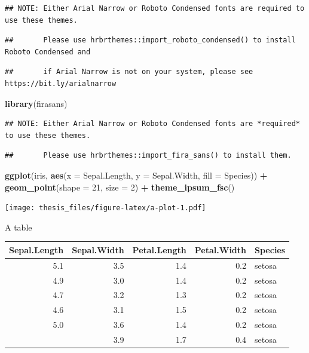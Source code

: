 \documentclass[oneside,12pt,a4paper,bibliography=totocnumbered,numbers=noenddot,table]{scrreprt} %
\newenvironment{Shaded}{\begin{snugshade}}{\end{snugshade}}
\newcommand{\KeywordTok}[1]{\textcolor[rgb]{0.13,0.29,0.53}{\textbf{{#1}}}}
\newcommand{\DataTypeTok}[1]{\textcolor[rgb]{0.13,0.29,0.53}{{#1}}}
\newcommand{\DecValTok}[1]{\textcolor[rgb]{0.00,0.00,0.81}{{#1}}}
\newcommand{\StringTok}[1]{\textcolor[rgb]{0.31,0.60,0.02}{{#1}}}
\newcommand{\OperatorTok}[1]{\textcolor[rgb]{0.81,0.36,0.00}{\textbf{{#1}}}}
\newcommand{\NormalTok}[1]{{#1}}
\begin{document}
\begin{verbatim}
## NOTE: Either Arial Narrow or Roboto Condensed fonts are required to use these themes.
\end{verbatim}

\begin{verbatim}
##       Please use hrbrthemes::import_roboto_condensed() to install Roboto Condensed and
\end{verbatim}

\begin{verbatim}
##       if Arial Narrow is not on your system, please see https://bit.ly/arialnarrow
\end{verbatim}

\begin{Shaded}
\begin{Highlighting}[]
\KeywordTok{library}\NormalTok{(firasans)}
\end{Highlighting}
\end{Shaded}

\begin{verbatim}
## NOTE: Either Arial Narrow or Roboto Condensed fonts are *required* to use these themes.
\end{verbatim}

\begin{verbatim}
##       Please use hrbrthemes::import_fira_sans() to install them.
\end{verbatim}

\begin{Shaded}
\begin{Highlighting}[]
\KeywordTok{ggplot}\NormalTok{(iris, }\KeywordTok{aes}\NormalTok{(}\DataTypeTok{x =}\NormalTok{ Sepal.Length, }\DataTypeTok{y =}\NormalTok{ Sepal.Width, }\DataTypeTok{fill =}\NormalTok{ Species)) }\OperatorTok{+}
\StringTok{  }\KeywordTok{geom\_point}\NormalTok{(}\DataTypeTok{shape =} \DecValTok{21}\NormalTok{, }\DataTypeTok{size =} \DecValTok{2}\NormalTok{) }\OperatorTok{+}
\StringTok{  }\KeywordTok{theme\_ipsum\_fsc}\NormalTok{()}
\end{Highlighting}
\end{Shaded}

\texttt{[image: thesis\_files/figure-latex/a-plot-1.pdf]}

A table

\begin{table}[H]
\centering
\begin{tabular}{rrrrl}
\toprule
Sepal.Length & Sepal.Width & Petal.Length & Petal.Width & Species\\
\midrule
5.1 & 3.5 & 1.4 & 0.2 & setosa\\
4.9 & 3.0 & 1.4 & 0.2 & setosa\\
4.7 & 3.2 & 1.3 & 0.2 & setosa\\
4.6 & 3.1 & 1.5 & 0.2 & setosa\\
5.0 & 3.6 & 1.4 & 0.2 & setosa\\
\addlinespace
5.4 & 3.9 & 1.7 & 0.4 & setosa\\
\bottomrule
\end{tabular}
\end{table}
\end{document}
